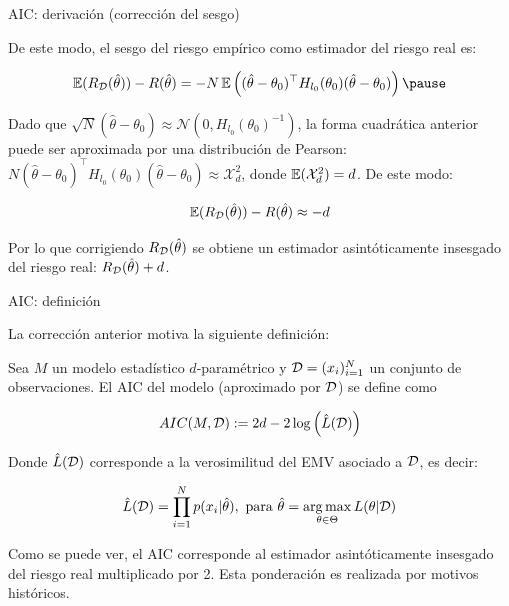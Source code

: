 \documentclass[handout, 9pt]{beamer}
\begin{document}
\begin{frame}{AIC: derivación (corrección del sesgo)}


De este modo, el sesgo del riesgo empírico como estimador del riesgo real es:

\begin{equation*}
	\E(R_\datos(\hat{\theta})) - R(\hat{\theta}) = -N \E\left((\hat{\theta}-\theta_0)^\top H_{l_0}(\theta_0) (\hat{\theta}-\theta_0)\right)\pause
\end{equation*}

Dado que $\sqrt{N}\left(\hat{\theta}-\theta_0\right)\approx\mathcal{N}\left(0,H_{l_0}(\theta_0)^{-1}\right)$, la forma cuadrática anterior puede ser aproximada por una distribución de Pearson: $N(\hat{\theta}-\theta_0)^\top H_{l_0}(\theta_0) (\hat{\theta}-\theta_0)\approx\mathcal{X}^2_d$, donde $\operatorname{\mathbb{E}}(\mathcal{X}^2_d)=d$. De este modo:

\begin{equation*}
	\operatorname{\mathbb{E}}(R_{\mathcal D}(\hat{\theta})) - R(\hat{\theta}) \approx -d
\end{equation*}\pause

Por lo que corrigiendo $R_{\mathcal D}(\hat{\theta})$ se obtiene un estimador asintóticamente insesgado del riesgo real: $R_{\mathcal D}(\hat{\theta})+d$.

\end{frame}

\begin{frame}{AIC: definición}

La corrección anterior motiva la siguiente definición:

\begin{definition}[AIC]
	Sea $M$ un modelo estadístico $d$-paramétrico y ${\mathcal D}=(x_i)_{i=1}^N$ un conjunto de observaciones. El AIC del modelo (aproximado por ${\mathcal D}$) se define como
	
	\begin{equation*}
		AIC(M,{\mathcal D}):=2d-2\log\left(\hat{L}({\mathcal D})\right)
	\end{equation*}
	
	Donde $\hat{L}({\mathcal D})$ corresponde a la verosimilitud del EMV asociado a ${\mathcal D}$, es decir:
	
	\begin{equation*}
		\hat{L}({\mathcal D}) = \prod_{i=1}^N p(x_i|\hat{\theta}),\text{ para } \hat{\theta} = \operatorname*{arg\,max}_{\theta\in\Theta} L(\theta|{\mathcal D})
	\end{equation*}
\end{definition}\pause

Como se puede ver, el AIC corresponde al estimador asintóticamente insesgado del riesgo real multiplicado por 2. Esta ponderación es realizada por motivos históricos.
	
\end{frame}
\end{document}
